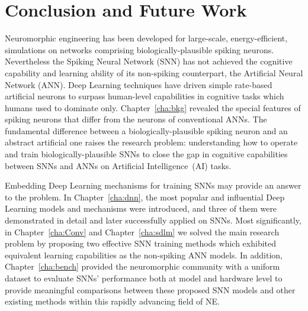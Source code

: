 \chapter{Conclusion and Future Work}
\label{cha:conc}
Neuromorphic engineering has been developed for large-scale, energy-efficient, simulations on networks comprising biologically-plausible spiking neurons.
Nevertheless the Spiking Neural Network (SNN) has not achieved the cognitive capability and learning ability of its non-spiking counterpart, the Artificial Neural Network (ANN).
Deep Learning techniques have driven simple rate-based artificial neurons to surpass human-level capabilities in cognitive tasks which humans used to dominate only. 
Chapter~\ref{cha:bkg} revealed the special features of spiking neurons that differ from the neurons of conventional ANNs.
The fundamental difference between a biologically-plausible spiking neuron and an abstract artificial one raises the research problem: understanding how to operate and train biologically-plausible SNNs to close the gap in cognitive capabilities between SNNs and ANNs on Artificial Intelligence~(AI) tasks.

Embedding Deep Learning mechanisms for training SNNs may provide an answer to the problem.
In Chapter~\ref{cha:dnn}, the most popular and influential Deep Learning models and mechanisms were introduced, and three of them were demonstrated in detail and later successfully applied on SNNs.
Most significantly, in Chapter~\ref{cha:Conv} and Chapter~\ref{cha:sdlm} we solved the main research problem by proposing two effective SNN training methods which exhibited equivalent learning capabilities as the non-spiking ANN models. 
In addition, Chapter~\ref{cha:bench} provided the neuromorphic community with a uniform dataset to evaluate SNNs' performance both at model and hardware level to provide meaningful comparisons between these proposed SNN models and other existing methods within this rapidly advancing field of NE.%

